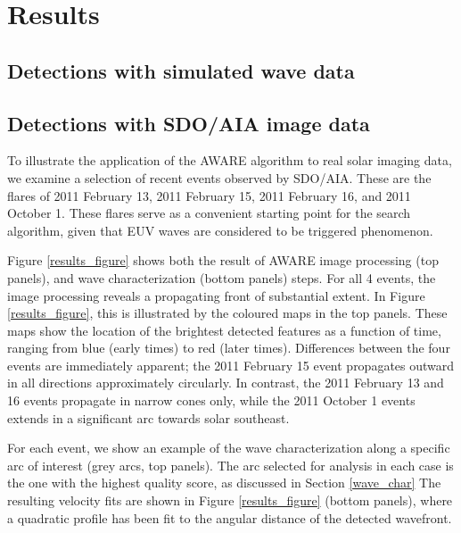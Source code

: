 \section{Results}\label{sec:results}

\subsection{Detections with simulated wave data}

\subsection{Detections with SDO/AIA image data}

To illustrate the application of the AWARE algorithm to real solar imaging data, we examine a selection of recent events observed by SDO/AIA. These are the flares of 2011 February 13, 2011 February 15, 2011 February 16, and 2011 October 1. These flares serve as a convenient starting point for the search algorithm, given that EUV waves are considered to be triggered phenomenon. 

Figure \ref{results_figure} shows both the result of AWARE image processing (top panels), and wave characterization (bottom panels) steps. For all 4 events, the image processing reveals a propagating front of substantial extent. In Figure \ref{results_figure}, this is illustrated by the coloured maps in the top panels. These maps show the location of the brightest detected features as a function of time, ranging from blue (early times) to red (later times). Differences between the four events are immediately apparent; the 2011 February 15 event propagates outward in all directions approximately circularly. In contrast, the 2011 February 13 and 16 events propagate in narrow cones only, while the 2011 October 1 events extends in a significant arc towards solar southeast. 

For each event, we show an example of the wave characterization along a specific arc of interest (grey arcs, top panels). The arc selected for analysis in each case is the one with the highest quality score, as discussed in Section \ref{wave_char} The resulting velocity fits are shown in Figure \ref{results_figure} (bottom panels), where a quadratic profile has been fit to the angular distance of the detected wavefront. 

